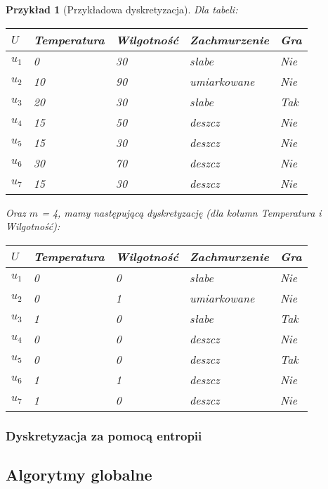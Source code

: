 \documentclass[magisterska]{pracamgr}
\theoremstyle{plain}
\newtheorem{przyklad}[thm]{Przykład}
\theoremstyle{definition}
\theoremstyle{remark}
\begin{document}
\begin{przyklad}[Przykładowa dyskretyzacja]
Dla tabeli:
\begin{center}
 \begin{tabular}{l || P{2.5cm} P{2.5cm} P{2.5cm} | P{1.5cm}}
  $U$     & Temperatura & Wilgotność & Zachmurzenie & Gra \\ 
  \hline
  $u_{1}$ & 0      & 30      & słabe          & Nie \\
  $u_{2}$ & 10     & 90      & umiarkowane    & Nie \\
  $u_{3}$ & 20     & 30      & słabe   	      & Tak \\
  $u_{4}$ & 15     & 50      & deszcz         & Nie \\
  $u_{5}$ & 15     & 30      & deszcz         & Nie \\
  $u_{6}$ & 30     & 70      & deszcz         & Nie \\
  $u_{7}$ & 15     & 30      & deszcz         & Nie \\
 \end{tabular}
\end{center}
Oraz $m$ = 4, mamy następującą dyskretyzację (dla kolumn Temperatura i Wilgotność):
\begin{center}
 \begin{tabular}{l || P{2.5cm} P{2.5cm} P{2.5cm} | P{1.5cm}}
  $U$     & Temperatura & Wilgotność & Zachmurzenie & Gra \\ 
  \hline
  $u_{1}$ & 0     & 0      & słabe          & Nie \\
  $u_{2}$ & 0     & 1      & umiarkowane    & Nie \\
  $u_{3}$ & 1     & 0      & słabe   	    & Tak \\
  $u_{4}$ & 0     & 0      & deszcz         & Nie \\
  $u_{5}$ & 0     & 0      & deszcz         & Tak \\
  $u_{6}$ & 1     & 1      & deszcz         & Nie \\
  $u_{7}$ & 1     & 0      & deszcz         & Nie \\
 \end{tabular}
\end{center}
\end{przyklad}
\subsubsection{Dyskretyzacja za pomocą entropii}
\subsection{Algorytmy globalne}
\end{document}
